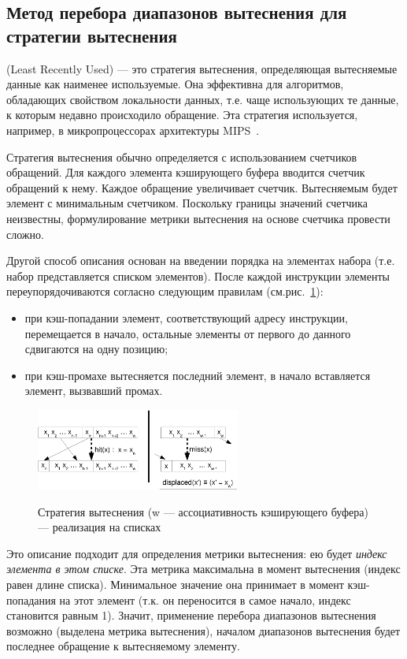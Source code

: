 \subsection{Метод перебора диапазонов вытеснения для стратегии
вытеснения \LRU}\label{LRU_constraints}

\LRU (Least Recently Used) --- это стратегия вытеснения,
определяющая вытесняемые данные как наименее используемые. Она
эффективна для алгоритмов, обладающих свойством локальности данных,
т.е. чаще использующих те данные, к которым недавно происходило
обращение. Эта стратегия используется, например, в микропроцессорах
архитектуры MIPS~\cite{mips64_II}.

Стратегия вытеснения \LRU обычно определяется с использованием
счетчиков обращений. Для каждого элемента кэширующего буфера
вводится счетчик обращений к нему. Каждое обращение увеличивает
счетчик. Вытесняемым будет элемент с минимальным счетчиком.
Поскольку границы значений счетчика неизвестны, формулирование
метрики вытеснения на основе счетчика провести сложно.

Другой способ описания \LRU основан на введении порядка на элементах
набора (т.е. набор представляется списком элементов). После каждой
инструкции элементы переупорядочиваются согласно следующим правилам
(см.рис.~\ref{lru1}):
\begin{itemize}
\item при кэш-попадании элемент, соответствующий адресу инструкции,
перемещается в начало, остальные элементы от первого до данного
сдвигаются на одну позицию;
\item при кэш-промахе вытесняется последний элемент, в начало
вставляется элемент, вызвавший промах.
\end{itemize}

\begin{figure}[h] \center
  \includegraphics[width=0.6\textwidth]{2.theor/lru1}\\
  \caption{Стратегия вытеснения \LRU (w --- ассоциативность кэширующего буфера)
  --- реализация на списках}\label{lru1}
\end{figure}

Это описание подходит для определения метрики вытеснения: ею будет
\emph{индекс элемента в этом списке}. Эта метрика максимальна в
момент вытеснения (индекс равен длине списка). Минимальное значение
она принимает в момент кэш-попадания на этот элемент (т.к. он
переносится в самое начало, индекс становится равным 1). Значит,
применение перебора диапазонов вытеснения возможно (выделена метрика
вытеснения), началом диапазонов вытеснения будет последнее обращение
к вытесняемому элементу.

